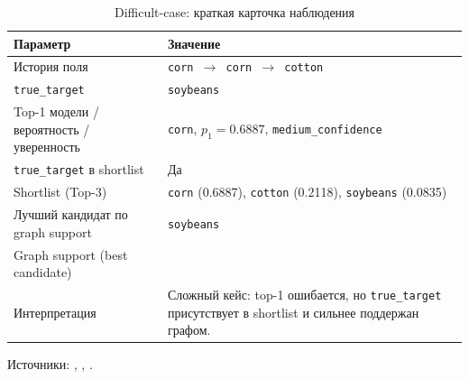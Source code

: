 \begin{table}[H]
\centering
\small
\caption{Difficult-case: краткая карточка наблюдения}
\label{tab:difficult-case-card}
\setlength{\tabcolsep}{4pt}
\renewcommand{\arraystretch}{1.12}
\begin{tabular}{|>{\raggedright\arraybackslash}p{}|>{\raggedright\arraybackslash}p{}|}
\hline
Параметр & Значение \\
\hline
История поля & \texttt{corn $\rightarrow$ corn $\rightarrow$ cotton} \\
\hline
\texttt{true\_target} & \texttt{soybeans} \\
\hline
Top-1 модели / вероятность / уверенность & \texttt{corn}, $p_1 = 0.6887$, \texttt{medium\_confidence} \\
\hline
\texttt{true\_target} в shortlist & Да \\
\hline
Shortlist (Top-3) & \texttt{corn} (0.6887), \texttt{cotton} (0.2118), \texttt{soybeans} (0.0835) \\
\hline
Лучший кандидат по graph support & \texttt{soybeans} \\
\hline
Graph support (best candidate) & 0.3863 \\
\hline
Интерпретация
    & Сложный кейс: top-1 ошибается, но \texttt{true\_target} присутствует в shortlist и сильнее поддержан графом. \\
\hline
\end{tabular}

\vspace{0.4em}
\footnotesize Источники: ,
,
.
\normalsize
\end{table}